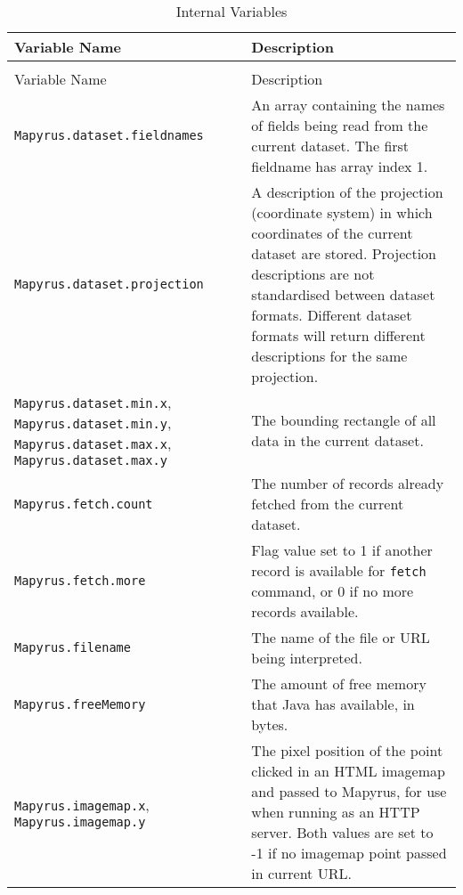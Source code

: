 \begin{longtable}{|p{5cm}|p{7cm}|}
\hline
\label{internalvariables}
Variable Name & Description \\
\hline
\hline
\endfirsthead
\hline
\caption{Internal Variables} \\
\endfoot

\hline
Variable Name & Description \\
\hline
\hline
\endhead

\texttt{Mapyrus.dataset.fieldnames} &
An array containing the names of fields being read from
the current dataset.  The first fieldname has array index 1. \\

\hline

\texttt{Mapyrus.dataset.projection} &
A description of the projection (coordinate system) in which coordinates
of the current dataset are stored.
Projection descriptions are not standardised between dataset formats.
Different dataset formats will return different descriptions for the same
projection. \\

\hline

\texttt{Mapyrus.dataset.min.x},
\texttt{Mapyrus.dataset.min.y},
\texttt{Mapyrus.dataset.max.x},
\texttt{Mapyrus.dataset.max.y} &
The bounding rectangle of all data in the current dataset. \\

\hline

\texttt{Mapyrus.fetch.count} &
The number of records already fetched from the current dataset. \\

\hline

\texttt{Mapyrus.fetch.more} &
Flag value set to 1 if another record is available
for \texttt{fetch}
command, or 0 if no more records available. \\

\hline

\texttt{Mapyrus.filename} &
The name of the file or URL being interpreted. \\

\hline

\texttt{Mapyrus.freeMemory} &
The amount of free memory that Java has available, in bytes. \\

\hline

\texttt{Mapyrus.imagemap.x},
\texttt{Mapyrus.imagemap.y} &
The pixel position of the point clicked in an HTML imagemap and
passed to Mapyrus, for use when running as an HTTP server.
Both values are set to -1 if no imagemap point passed in current URL. \\


\end{longtable}
